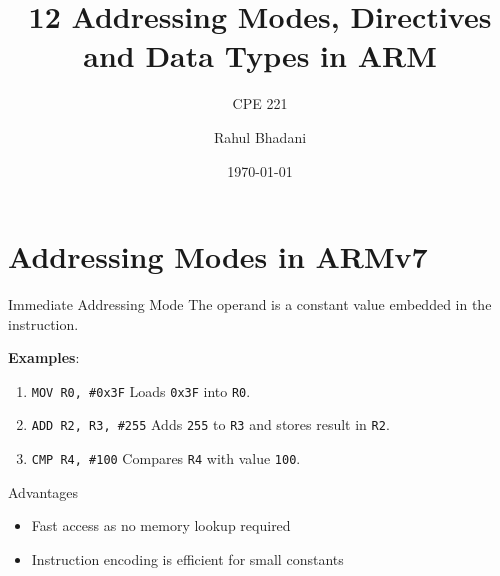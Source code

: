 \documentclass[aspectratio=169]{beamer}
\title{12 Addressing Modes, Directives and Data Types in ARM}
\subtitle{CPE 221}
\author{Rahul Bhadani}
\institute{The University of Alabama in Huntsville}
\date{\today}
\begin{document}
\begin{frame}

    \titlepage

\end{frame}

\begin{frame}{}
    \tableofcontents
\end{frame}

\section{Addressing Modes in ARMv7}
\begin{frame}
    \sectionpage
\end{frame}

\begin{frame}{Immediate Addressing Mode}
The operand is a constant value embedded in the instruction.
    
    \textbf{Examples}:
    \begin{enumerate}
        \item \texttt{MOV R0, \#0x3F}  
        Loads \texttt{0x3F} into \texttt{R0}.
        
        \item \texttt{ADD R2, R3, \#255}  
        Adds \texttt{255} to \texttt{R3} and stores result in \texttt{R2}.
        
        \item \texttt{CMP R4, \#100}  
        Compares \texttt{R4} with value \texttt{100}.
    \end{enumerate}

    \begin{block}{Advantages}
        \begin{itemize}
        \item Fast access as no memory lookup required
        \item Instruction encoding is efficient for small constants
        \end{itemize}
    \end{block}

\end{frame}
\end{document}

